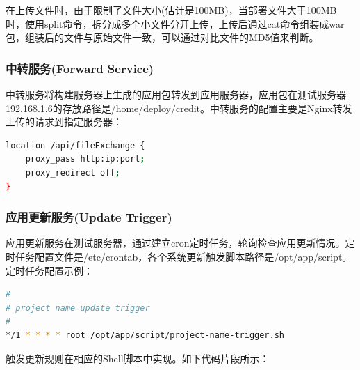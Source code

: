 \documentclass{book}
\begin{document}
在上传文件时，由于限制了文件大小(估计是100MB)，当部署文件大于100MB时，使用split命令，拆分成多个小文件分开上传，上传后通过cat命令组装成war包，组装后的文件与原始文件一致，可以通过对比文件的MD5值来判断。

\subsubsection{中转服务(Forward Service)}

中转服务将构建服务器上生成的应用包转发到应用服务器，应用包在测试服务器192.168.1.6的存放路径是/home/deploy/credit。中转服务的配置主要是Nginx转发上传的请求到指定服务器：

\begin{lstlisting}[language=Bash]
location /api/fileExchange {
	proxy_pass http:ip:port;
	proxy_redirect off;
}
\end{lstlisting}

\subsubsection{应用更新服务(Update Trigger)}

应用更新服务在测试服务器，通过建立cron定时任务，轮询检查应用更新情况。定时任务配置文件是/etc/crontab，各个系统更新触发脚本路径是/opt/app/script。定时任务配置示例：

\begin{lstlisting}[language=Bash]
#
# project name update trigger
#
*/1 * * * * root /opt/app/script/project-name-trigger.sh
\end{lstlisting}

触发更新规则在相应的Shell脚本中实现。如下代码片段所示：
\end{document}
